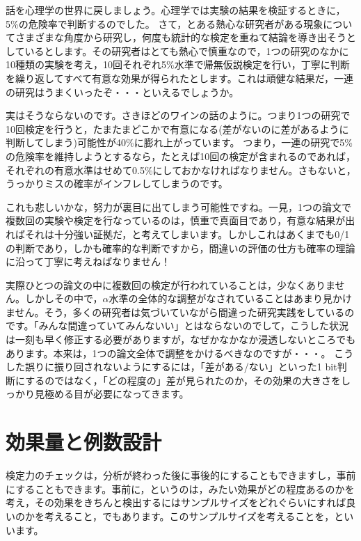 \documentclass{ltjsbook}
\begin{document}
話を心理学の世界に戻しましょう。心理学では実験の結果を検証するときに，5\%の危険率で判断するのでした。
さて，とある熱心な研究者がある現象についてさまざまな角度から研究し，何度も統計的な検定を重ねて結論を導き出そうとしているとします。その研究者はとても熱心で慎重なので，1つの研究のなかに10種類の実験を考え，10回それぞれ5\%水準で帰無仮説検定を行い，丁寧に判断を繰り返してすべて有意な効果が得られたとします。これは頑健な結果だ，一連の研究はうまくいったぞ・・・といえるでしょうか。

実はそうならないのです。さきほどのワインの話のように。つまり1つの研究で10回検定を行うと，たまたまどこかで有意になる(差がないのに差があるように判断してしまう)可能性が40\%に膨れ上がっています。
つまり，一連の研究で5\%の危険率を維持しようとするなら，たとえば10回の検定が含まれるのであれば，それぞれの有意水準はせめて0.5\%にしておかなければなりません。さもないと，うっかりミスの確率がインフレしてしまうのです。

これも悲しいかな，努力が裏目に出てしまう可能性ですね。一見，1つの論文で複数回の実験や検定を行なっているのは，慎重で真面目であり，有意な結果が出ればそれは十分強い証拠だ，と考えてしまいます。しかしこれはあくまでも0/1の判断であり，しかも確率的な判断ですから，間違いの評価の仕方も確率の理論に沿って丁寧に考えねばなりません！

実際ひとつの論文の中に複数回の検定が行われていることは，少なくありません。しかしその中で，$\alpha$水準の全体的な調整がなされていることはあまり見かけません。そう，多くの研究者は気づいていながら間違った研究実践をしているのです。「みんな間違っていてみんないい」とはならないのでして，こうした状況は一刻も早く修正する必要がありますが，なぜかなかなか浸透しないところでもあります。本来は，1つの論文全体で調整をかけるべきなのですが・・・。
こうした誤りに振り回されないようにするには，「差がある/ない」といった1 bit判断にするのではなく，「どの程度の」差が見られたのか，その効果の大きさをしっかり見極める目が必要になってきます。


\section{効果量と例数設計}
\label{sec:14_04}
検定力のチェックは，分析が終わった後に事後的にすることもできますし，事前にすることもできます。事前に，というのは，みたい効果がどの程度あるのかを考え，その効果をきちんと検出するにはサンプルサイズをどれぐらいにすれば良いのかを考えること，でもあります。このサンプルサイズを考えることを，といいます。
\end{document}

